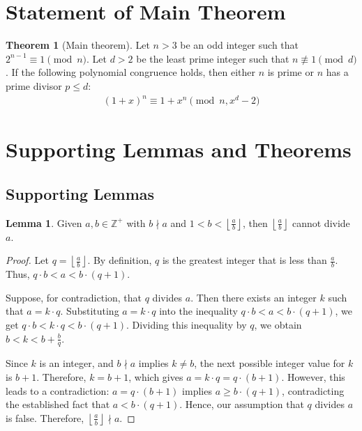 \documentclass{article}
\theoremstyle{plain}
\theoremstyle{definition}
\newtheorem{theorem}{Theorem}
\newtheorem{lemma}{Lemma}
\newcommand{\Z}{\mathbb{Z}}
\begin{document}
\section{Statement of Main Theorem}
\begin{theorem}[Main theorem]
\label{theorem:main}
Let $n > 3$ be an odd integer such that $2^{n-1} \equiv 1 \pmod{n}$. Let $d > 2$ be the least prime integer such that $n \not\equiv 1 \pmod{d}$. If the following polynomial congruence holds, then either $n$ is prime or $n$ has a prime divisor $p \leq d$:
\begin{align}
(1 + x)^n \equiv 1 + x^n \pmod{n, x^d - 2}
\end{align}
\end{theorem}

\section{Supporting Lemmas and Theorems}

\subsection{Supporting Lemmas}
\begin{lemma} \label{lemma:floornondivisor}
Given $a,b \in \Z^{+}$ with \(b \nmid a\) and \( 1 < b < \left\lfloor \frac{a}{b} \right\rfloor \), then \(\left\lfloor \frac{a}{b} \right\rfloor \) cannot divide \(a\).
\end{lemma}
\begin{proof}
Let \(q = \left\lfloor \frac{a}{b} \right\rfloor\). By definition, \(q\) is the greatest integer that is less than \(\frac{a}{b}\). Thus, \(q \cdot b < a < b \cdot (q + 1)\).

Suppose, for contradiction, that \(q\) divides \(a\). Then there exists an integer \(k\) such that \(a = k \cdot q\). Substituting \(a = k \cdot q\) into the inequality \(q \cdot b < a < b \cdot (q + 1) \), we get \(q \cdot b < k \cdot q < b \cdot (q + 1) \). Dividing this inequality by \(q\), we obtain \(b < k < b + \frac{b}{q}\).

Since \(k\) is an integer, and \(b \nmid a\) implies \(k \neq b\), the next possible integer value for \(k\) is \(b + 1\). Therefore, \(k = b + 1\), which gives \(a = k \cdot q = q \cdot (b + 1)\). However, this leads to a contradiction: \(a = q \cdot (b + 1) \) implies \(a \geq b \cdot (q + 1) \), contradicting the established fact that \(a < b \cdot (q + 1) \). Hence, our assumption that \(q\) divides \(a\) is false. Therefore, \(\left\lfloor \frac{a}{b} \right\rfloor \nmid a\).
\end{proof}
\end{document}
